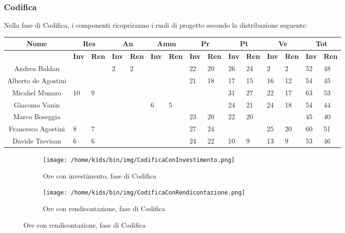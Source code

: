 \documentclass{scalatekids-article}
\begin{document}
\subsubsection{Codifica}
Nella fase di Codifica, i componenti ricopriranno i ruoli di progetto secondo la distribuzione seguente:
\begin{center}
  \scriptsize
  \begin{tabular}{| c | p{0.35cm}  p{0.35cm} | p{0.35cm}  p{0.35cm} | p{0.35cm}  p{0.35cm} | p{0.35cm}  p{0.35cm} | p{0.35cm}  p{0.35cm} | p{0.35cm}  p{0.35cm} | p{0.35cm}  p{0.35cm} |}
    \hline
    \textbf{Nome} & \multicolumn{2}{|c|}{\textbf{Res}} & \multicolumn{2}{|c|}{\textbf{An}} & \multicolumn{2}{|c|}{\textbf{Amm}} & \multicolumn{2}{|c|}{\textbf{Pr}} & \multicolumn{2}{|c|}{\textbf{Pt}} & \multicolumn{2}{|c|}{\textbf{Ve}} & \multicolumn{2}{|c|}{\textbf{Tot}}\\
    \hline
    & \textbf{Inv} & \textbf{Ren} & \textbf{Inv} & \textbf{Ren} & \textbf{Inv} & \textbf{Ren} & \textbf{Inv} & \textbf{Ren} & \textbf{Inv} & \textbf{Ren} & \textbf{Inv} & \textbf{Ren} & \textbf{Inv} & \textbf{Ren}\\
    \hline
    Andrea Baldan & & & 2 & 2 & & & 22 & 20 & 26 & 24 & 2 & 2 & 52 & 48\\
    Alberto de Agostini & & & & & & & 21 & 18 & 17 & 15 & 16 & 12 & 54 & 45\\
    Micahel Munaro & 10 & 9 & & & & & & & 31 & 27 & 22 & 17 & 63 & 53\\
    Giacomo Vanin & & & & & 6 & 5 & & & 24 & 21 & 24 & 18 & 54 & 44\\
    Marco Boseggia & & & & & & & 23 & 20 & 22 & 20 & & & 45 & 40\\
    Francesco Agostini & 8 & 7 & & & & & 27 & 24 & & & 25 & 20 & 60 & 51\\
    Davide Trevisan & 6 & 6 & & & & & 24 & 22 & 10 & 9 & 13 & 9 & 53 & 46\\
    \hline
  \end{tabular}
\end{center}
\normalsize
\begin{figure}[H]
  \begin{subfigure}[H]{0.47\textwidth}
    \texttt{[image: /home/kids/bin/img/CodificaConInvestimento.png]}
    \caption{Ore con investimento, fase di Codifica}
  \end{subfigure}
  \qquad
  \begin{subfigure}[H]{0.47\textwidth}
    \texttt{[image: /home/kids/bin/img/CodificaConRendicontazione.png]}
    \caption{Ore con rendicontazione, fase di Codifica}
  \end{subfigure}
\end{figure}
\end{document}
